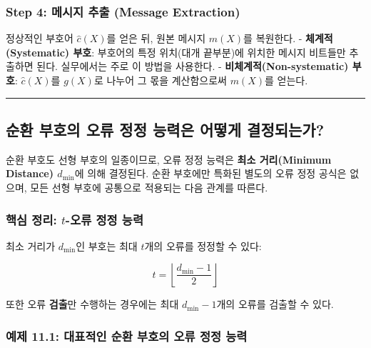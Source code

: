 \documentclass[
  oneside]{article}
\begin{document}
\subsubsection{Step 4: 메시지 추출 (Message
Extraction)}\label{step-4-uxba54uxc2dcuxc9c0-uxcd94uxcd9c-message-extraction}

정상적인 부호어 \(\hat{c}(X)\)를 얻은 뒤, 원본 메시지 \(m(X)\)를
복원한다. - \textbf{체계적(Systematic) 부호}: 부호어의 특정 위치(대개
끝부분)에 위치한 메시지 비트들만 추출하면 된다. 실무에서는 주로 이
방법을 사용한다. - \textbf{비체계적(Non-systematic) 부호}:
\(\hat{c}(X)\)를 \(g(X)\)로 나누어 그 몫을 계산함으로써 \(m(X)\)를
얻는다.

\begin{center}\rule{0.5\linewidth}{0.5pt}\end{center}

\subsection{순환 부호의 오류 정정 능력은 어떻게
결정되는가?}\label{uxc21cuxd658-uxbd80uxd638uxc758-uxc624uxb958-uxc815uxc815-uxb2a5uxb825uxc740-uxc5b4uxb5bbuxac8c-uxacb0uxc815uxb418uxb294uxac00}

순환 부호도 선형 부호의 일종이므로, 오류 정정 능력은 \textbf{최소
거리(Minimum Distance) \(d_{\min}\)}에 의해 결정된다. 순환 부호에만
특화된 별도의 오류 정정 공식은 없으며, 모든 선형 부호에 공통으로
적용되는 다음 관계를 따른다.

\subsubsection{\texorpdfstring{핵심 정리: \(t\)-오류 정정
능력}{핵심 정리: t-오류 정정 능력}}\label{uxd575uxc2ec-uxc815uxb9ac-t-uxc624uxb958-uxc815uxc815-uxb2a5uxb825}

최소 거리가 \(d_{\min}\)인 부호는 최대 \(t\)개의 오류를 정정할 수 있다:

\[t = \left\lfloor \frac{d_{\min} - 1}{2} \right\rfloor\]

또한 오류 \textbf{검출}만 수행하는 경우에는 최대 \(d_{\min} - 1\)개의
오류를 검출할 수 있다.

\subsubsection{예제 11.1: 대표적인 순환 부호의 오류 정정
능력}\label{uxc608uxc81c-11.1-uxb300uxd45cuxc801uxc778-uxc21cuxd658-uxbd80uxd638uxc758-uxc624uxb958-uxc815uxc815-uxb2a5uxb825}
\end{document}
